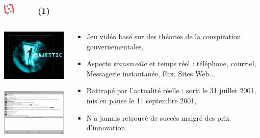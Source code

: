 \documentclass[slidetop,11pt]{beamer}
\def\moreInFrameTitleLeftt{\includegraphics[height=0.5cm]{img/ligueludique-0.png}~~~~~}
\begin{document}
\subsubsection{\sectionPartIIaV} %
\begin{frame}
	\frametitle{\moreInFrameTitleLeftt \sectionPartIIaV  (1) }
	
	\begin{columns}[T]
		\begin{column}[T]{5.05cm}
			\includegraphics[width=5.00cm]{img/majesticARGgame/majestic-screenshot-ME0000034566_2.jpg}~\\
			\includegraphics[width=5.00cm]{img/majesticARGgame/ca-a-bien-change-teens-irc-net-ME0000034567_2.jpg}~\\
		\end{column}
		\begin{column}[T]{5.05cm}
			\begin{itemize}
				\item Jeu vid{\'e}o bas{\'e} sur des th{\'e}ories de la conspiration gouvernementales, 
				\item Aspects \emph{transmedia} et temps r{\'e}el : t{\'e}l{\'e}phone, courriel, Messagerie instantan{\'e}e, Fax, Sites Web...
				\item Rattrap{\'e} par l'actualit{\'e} r{\'e}elle : sorti le 31 juillet 2001, mis en pause le 11 septembre 2001, 
				\item N'a jamais retrouv{\'e} de succ{\`e}s malgr{\'e} des prix d'innovation. 
			\end{itemize}
		\end{column}
	\end{columns}
\end{frame} 
\end{document}
